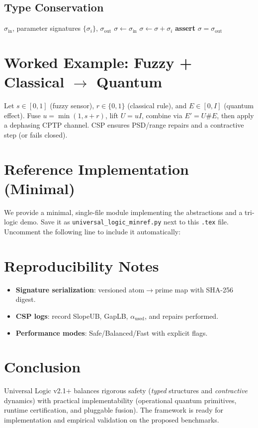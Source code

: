 \documentclass[11pt]{article}
\begin{document}
\subsection{Type Conservation}
\begin{algorithm}
\caption{Signature conservation}\label{alg:type}
\begin{algorithmic}[1]
\Require $\sigma_{\text{in}}$, parameter signatures $\{\sigma_i\}$, $\sigma_{\text{out}}$
\State $\sigma \gets \sigma_{\text{in}}$
 \State $\sigma \gets \sigma + \sigma_i$ \EndFor
\State \textbf{assert} $\sigma = \sigma_{\text{out}}$
\end{algorithmic}
\end{algorithm}

\section{Worked Example: Fuzzy + Classical \texorpdfstring{$\to$}{->} Quantum}
Let $s\in[0,1]$ (fuzzy sensor), $r\in\{0,1\}$ (classical rule), and $E\in[0,I]$ (quantum effect). Fuse $u=\min(1,s+r)$, lift $U=uI$, combine via $E' = U \# E$, then apply a dephasing CPTP channel. CSP ensures PSD/range repairs and a contractive step (or fails closed).

\section{Reference Implementation (Minimal)}
We provide a minimal, single-file module implementing the abstractions and a tri-logic demo. Save it as \texttt{universal\_logic\_minref.py} next to this \texttt{.tex} file. Uncomment the following line to include it automatically:
\begin{center}
% 
\end{center}

\section{Reproducibility Notes}
\begin{itemize}
  \item \textbf{Signature serialization}: versioned atom$\to$prime map with SHA-256 digest.
  \item \textbf{CSP logs}: record \textsf{SlopeUB}, \textsf{GapLB}, $\alpha_{\text{used}}$, and repairs performed.
  \item \textbf{Performance modes}: Safe/Balanced/Fast with explicit flags.
\end{itemize}

\section{Conclusion}
Universal Logic v2.1+ balances rigorous safety (\emph{typed} structures and \emph{contractive} dynamics) with practical implementability (operational quantum primitives, runtime certification, and pluggable fusion). The framework is ready for implementation and empirical validation on the proposed benchmarks.
\end{document}
